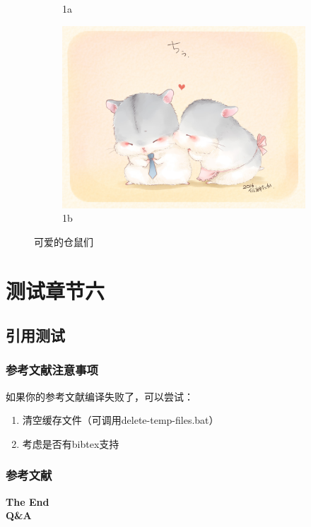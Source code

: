 \documentclass[presentation,aspectratio=1610]{beamer}
\begin{document}
\begin{frame}
\begin{figure}
\begin{subfigure}{0.45\textwidth}
		\caption*{1a}
		\label{fig:sfig1}
	\end{subfigure}%
	\begin{subfigure}{0.45\textwidth}
		\centering
		\includegraphics[width=0.6\linewidth]{image4.jpg}
		\caption*{1b}
		\label{fig:sfig2}
	\end{subfigure}
	\vspace{-10pt}
	\caption*{可爱的仓鼠们}
	\label{fig:fig}
	\end{figure}
\end{frame}

\section{测试章节六}

\subsection{引用测试}
\begin{frame}
 	\frametitle{参考文献注意事项}
 	如果你的参考文献编译失败了，可以尝试：
 	\begin{enumerate}
 		\item 清空缓存文件（可调用delete-temp-files.bat）
 		\item 考虑是否有bibtex支持
 	\end{enumerate}
\end{frame}
\begin{frame}[t,allowframebreaks]
	\frametitle{参考文献}
	\nocite{*}
	\printbibliography
\end{frame}


\begin{frame}{}
	\centering
		\Huge\bfseries
	\textcolor{whucolor}{The End}\\
	\textcolor{whucolor}{Q\&A}\\
\end{frame}

\end{document}
